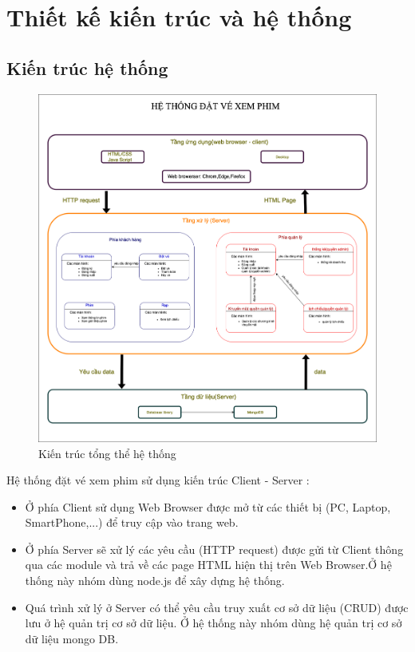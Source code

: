 \documentclass[a4paper, 12pt]{article}
\begin{document}
\section{Thiết kế kiến trúc và hệ thống}

\subsection{Kiến trúc hệ thống}
	  \begin{figure}[H]
	 	\begin{center}
	 		\includegraphics[scale = 0.25]{image/4.1.png}
	 		\caption{Kiến trúc tổng thể hệ thống}
	 	\end{center}
	 \end{figure}
 	Hệ thống đặt vé xem phim sử dụng kiến trúc Client - Server :
 	\begin{itemize}
 		\item Ở phía Client sử dụng Web Browser được mở từ các thiết bị (PC, Laptop, SmartPhone,...) để truy cập vào trang web.
 		\item Ở phía Server sẽ xử lý các yêu cầu (HTTP request) được gửi từ Client thông qua các module và trả về các page HTML hiện thị trên Web Browser.Ở hệ thống này nhóm dùng node.js để xây dựng hệ thống.
 		\item Quá trình xử lý ở Server có thể yêu cầu truy xuất cơ sở dữ liệu (CRUD) được lưu ở hệ quản trị cơ sở dữ liệu. Ở hệ thống này nhóm dùng hệ quản trị cơ sở dữ liệu mongo DB.
 	\end{itemize}
	
\end{document}
